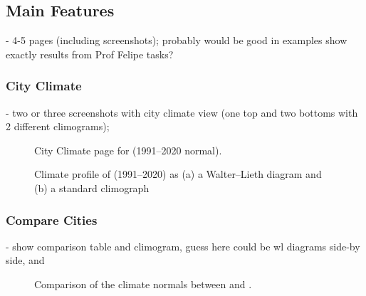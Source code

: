 \subsection{Main Features}\label{sec:web-application:features}
- 4-5 pages (including screenshots); probably would be good in examples show exactly results from Prof Felipe tasks?

\subsubsection{City Climate}\label{sec:web-application:features:city-climate}
- two or three screenshots with city climate view (one top and two bottoms with 2 different climograms); 

\begin{figure}[t]
  \centering
  \caption{City Climate page for \examplecity{} (1991--2020 normal).}
  \label{fig:city-climate}
\end{figure}

\begin{figure}[t]
  \centering
  \begin{minipage}[t]{0.49\textwidth}
    \centering
  \end{minipage}
  \begin{minipage}[t]{0.49\textwidth}
    \centering
  \end{minipage}\hfill
  \caption{Climate profile of \examplecity{} (1991--2020) as (a) a Walter--Lieth diagram and (b) a standard
    climograph}
  \label{fig:climographs}
\end{figure}

\subsubsection{Compare Cities}\label{sec:web-application:features:compare-cities}
- show comparison table and climogram, guess here could be wl diagrams side-by side, and

\begin{figure}[t]
  \centering
  \caption{Comparison of the climate normals between \examplecity{} and \examplecity{}.}
  \label{fig:compare-periods}
\end{figure}

